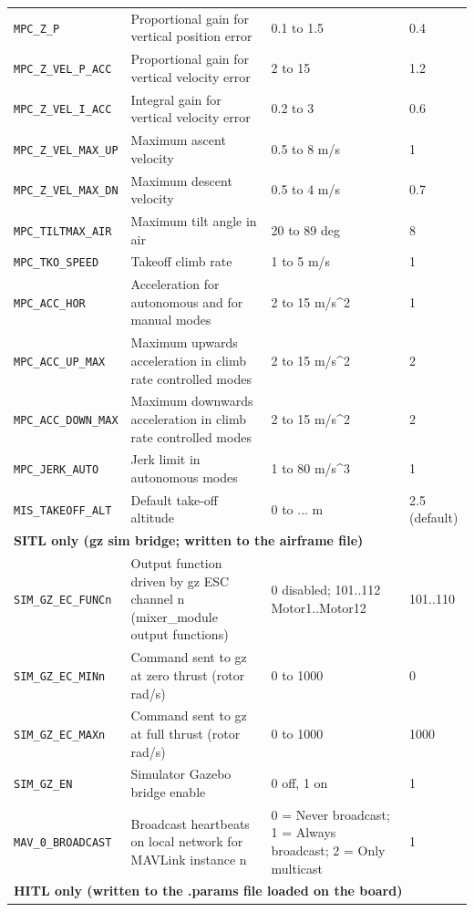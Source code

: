 \documentclass[11pt,a4paper]{article}
\newcommand{\param}[1]{\texttt{#1}}
\begin{document}
{\begin{longtable}{@{}p{3.3cm}p{5.6cm}p{3.6cm}p{1.9cm}@{}}
\param{MPC\_Z\_P} & Proportional gain for vertical position error & 0.1 to 1.5 & 0.4 \\
\param{MPC\_Z\_VEL\_P\_ACC} & Proportional gain for vertical velocity error & 2 to 15 & 1.2 \\
\param{MPC\_Z\_VEL\_I\_ACC} & Integral gain for vertical velocity error & 0.2 to 3 & 0.6 \\
\param{MPC\_Z\_VEL\_MAX\_UP} & Maximum ascent velocity & 0.5 to 8 m/s & 1 \\
\param{MPC\_Z\_VEL\_MAX\_DN} & Maximum descent velocity & 0.5 to 4 m/s & 0.7 \\
\param{MPC\_TILTMAX\_AIR} & Maximum tilt angle in air & 20 to 89 deg & 8 \\
\param{MPC\_TKO\_SPEED} & Takeoff climb rate & 1 to 5 m/s & 1 \\
\param{MPC\_ACC\_HOR} & Acceleration for autonomous and for manual modes & 2 to 15 m/s\^{}2 & 1 \\
\param{MPC\_ACC\_UP\_MAX} & Maximum upwards acceleration in climb rate controlled modes & 2 to 15 m/s\^{}2 & 2 \\
\param{MPC\_ACC\_DOWN\_MAX} & Maximum downwards acceleration in climb rate controlled modes & 2 to 15 m/s\^{}2 & 2 \\
\param{MPC\_JERK\_AUTO} & Jerk limit in autonomous modes & 1 to 80 m/s\^{}3 & 1 \\
\param{MIS\_TAKEOFF\_ALT} & Default take-off altitude & 0 to ... m & 2.5 (default) \\
\midrule
\multicolumn{4}{l}{\textbf{SITL only (gz sim bridge; written to the airframe file)}} \\
\midrule
\param{SIM\_GZ\_EC\_FUNCn} & Output function driven by gz ESC channel n (mixer\_module output functions) & 0 disabled; 101..112 Motor1..Motor12 & 101..110 \\
\param{SIM\_GZ\_EC\_MINn} & Command sent to gz at zero thrust (rotor rad/s) & 0 to 1000 & 0 \\
\param{SIM\_GZ\_EC\_MAXn} & Command sent to gz at full thrust (rotor rad/s) & 0 to 1000 & 1000 \\
\param{SIM\_GZ\_EN} & Simulator Gazebo bridge enable & 0 off, 1 on & 1 \\
\param{MAV\_0\_BROADCAST} & Broadcast heartbeats on local network for MAVLink instance n & 0 = Never broadcast; 1 = Always broadcast; 2 = Only multicast & 1 \\
\midrule
\multicolumn{4}{l}{\textbf{HITL only (written to the .params file loaded on the board)}} \\

\end{longtable}}
\end{document}
